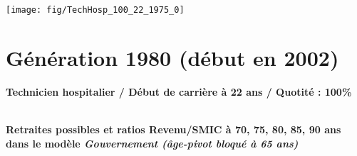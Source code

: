  \vspace{0.1cm} 

 {\hspace{-2.2cm}\texttt{[image: fig/TechHosp\_100\_22\_1975\_0]}} 

\newpage 
 
\section{Génération 1980 (début en 2002)\label{TechHosp_100_22_1980_0}} 
 
{\bf \noindent Technicien hospitalier / Début de carrière à 22 ans / Quotité : 100\%}  ~ 

 ~\\{\bf \noindent Retraites possibles et ratios Revenu/SMIC à 70, 75, 80, 85, 90 ans dans le modèle \emph{Gouvernement (âge-pivot bloqué à 65 ans)}}  
 
